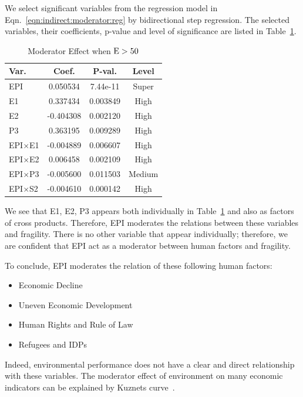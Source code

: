 We select significant variables from the regression model in Eqn.~\ref{eqn:indirect:moderator:reg} by bidirectional step regression. The selected variables, their coefficients, p-value and level of significance are listed in Table~\ref{tab:exp:indirect:moderator:case1}.

\begin{table}[htbp]
    \small
    \centering
   \begin{tabular}{|l|ccc|}\hline
      Var. & Coef. & P-val. & Level \\ \hline
      EPI & 0.050534 & 7.44e-11 & Super \\ \hline
      E1 & 0.337434 & 0.003849 & High \\ \hline
      E2 & -0.404308 & 0.002120 & High \\ \hline
      P3 & 0.363195 & 0.009289 & High \\ \hline
      EPI$\times$E1 & -0.004889 & 0.006607 & High \\ \hline
      EPI$\times$E2 & 0.006458 & 0.002109 & High \\ \hline
      EPI$\times$P3 & -0.005600 & 0.011503 & Medium \\ \hline
      EPI$\times$S2 & -0.004610 & 0.000142 & High \\ \hline
   \end{tabular} 
   \caption{Moderator Effect when $\operatorname*{E} > 50$}
   \label{tab:exp:indirect:moderator:case1}
\end{table}

We see that E1, E2, P3 appears both individually in Table~\ref{tab:exp:indirect:moderator:case1} and also as factors of cross products. Therefore, EPI moderates the relations between these variables and fragility. There is no other variable that appear individually; therefore, we are confident that EPI act as a moderator between human factors and fragility.

To conclude,
EPI moderates the relation of these following human factors:
\begin{itemize}
    \item Economic Decline
    \item Uneven Economic Development
    \item Human Rights and Rule of Law
    \item Refugees and IDPs 
\end{itemize}
Indeed, environmental performance does not have a clear and direct relationship with these variables. The moderator effect of environment on many economic indicators can be explained by Kuznets curve~.


